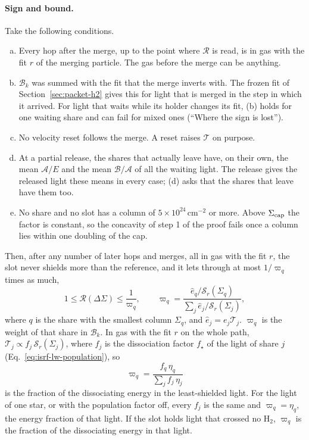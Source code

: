 \paragraph{Sign and bound.} Take the following conditions.
\begin{enumerate}[(a)]
  \item Every hop after the merge, up to the point where $\mathcal R$ is read,
    is in gas with the fit $r$ of the merging particle. The gas before the merge
    can be anything.
  \item $\mathcal B_k$ was summed with the fit that the merge inverts with.
    The frozen fit of Section~\ref{sec:packet-h2} gives this for light that is
    merged in the step in which it arrived. For light that waits while its
    holder changes its fit, (b) holds for one waiting share and can fail for
    mixed ones (``Where the sign is lost'').
  \item No velocity reset follows the merge. A reset raises $\mathcal T$ on
    purpose.
  \item At a partial release, the shares that actually leave have, on their
    own, the mean $\mathcal A/E$ and the mean $\mathcal B/\mathcal A$ of all
    the waiting light. The release gives the released light these means in
    every case; (d) asks that the shares that leave have them too.
  \item No share and no slot has a column of $5\times10^{24}$\,cm$^{-2}$ or
    more. Above $\Sigma_{\rm cap}$ the factor is constant, so the concavity of
    step 1 of the proof fails once a column lies within one doubling of the
    cap.
\end{enumerate}
Then, after any number of later hops and merges, all in gas with the fit $r$,
the slot never shields more than the reference, and it lets through at most
$1/\varpi_q$ times as much,
\begin{equation}
  1\le\mathcal R(\Delta\Sigma)\le\frac{1}{\varpi_q}, \qquad
  \varpi_q=\frac{\hat e_q/\mathcal S_r(\Sigma_q)}{\sum_j \hat e_j/\mathcal S_r(\Sigma_j)},
  \label{eq:h2-bound}
\end{equation}
where $q$ is the share with the smallest column $\Sigma_q$, and
$\hat e_j=e_j\mathcal T_j$. $\varpi_q$ is the weight of that share in $\mathcal B_k$. In
gas with the fit $r$ on the whole path,
$\mathcal T_j\propto f_j\,\mathcal S_r(\Sigma_j)$, where $f_j$ is the
dissociation factor $f_\star$ of the light of share $j$
(Eq.~\eqref{eq:isrf-lw-population}), so
\begin{equation}
  \varpi_q=\frac{f_q\,\eta_q}{\sum_j f_j\,\eta_j}
\end{equation}
is the fraction of the dissociating energy in the least-shielded light. For
the light of one star, or with the population factor off, every $f_j$ is the
same and $\varpi_q=\eta_q$, the energy fraction of that light. If the slot
holds light that crossed no H$_2$, $\varpi_q$ is the fraction of the
dissociating energy in that light.

